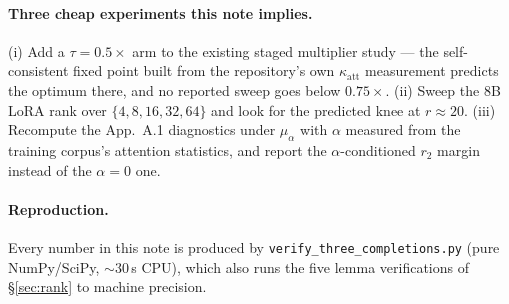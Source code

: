 \documentclass[11pt]{article}
\theoremstyle{definition}
\begin{document}
\paragraph{Three cheap experiments this note implies.}
(i) Add a $\tau=0.5\times$ arm to the existing staged multiplier study --- the self-consistent
fixed point built from the repository's own $\kappa_{\mathrm{att}}$ measurement predicts the
optimum there, and no reported sweep goes below $0.75\times$.
(ii) Sweep the 8B LoRA rank over $\{4,8,16,32,64\}$ and look for the predicted knee at $r\approx20$.
(iii) Recompute the App.~A.1 diagnostics under $\mu_\alpha$ with $\alpha$ measured from the training
corpus's attention statistics, and report the $\alpha$-conditioned $r_2$ margin instead of the
$\alpha{=}0$ one.

\paragraph{Reproduction.} Every number in this note is produced by
\texttt{verify\_three\_completions.py} (pure NumPy/SciPy, ${\sim}30$\,s CPU), which also runs the
five lemma verifications of \S\ref{sec:rank} to machine precision.
\end{document}
